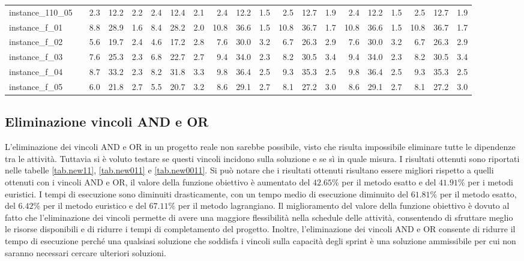 \documentclass[12pt,a4paper,openright,twoside]{book}
\begin{document}
\begin{table}[H]
{\begin{tabular}{|ll|rrrrrr|rrrrrr|rrrrrr|}
 instance\_110\_05            &     &        2.3  &   12.2  &  2.2  &   2.4  &   12.4  &  2.1  &     2.4  &   12.2  &  1.5  &   2.5  &   12.7  &  1.9  &    2.4  &   12.2  &  1.5  &   2.5  &   12.7  &  1.9   \\         
 instance\_f\_01              &     &       8.8  &   28.9  &  1.6  &   8.4  &   28.2  &  2.0  &     10.8  &   36.6  &  1.5  &   10.8  &   36.7  &  1.7  &  10.8  &   36.6  &  1.5  &   10.8  &   36.7  &  1.7  \\       
 instance\_f\_02              &     &        5.6  &   19.7  &  2.4  &   4.6  &   17.2  &  2.8  &     7.6  &   30.0  &  3.2  &   6.7  &   26.3  &  2.9  &    7.6  &   30.0  &  3.2  &   6.7  &   26.3  &  2.9  \\        
 instance\_f\_03              &     &       7.6  &   25.3  &  2.3  &   6.8  &   22.7  &  2.7  &     9.4  &   34.0  &  2.3  &   8.2  &   30.5  &  3.4  &    9.4  &   34.0  &  2.3  &   8.2  &   30.5  &  3.4  \\    
 instance\_f\_04              &     &        8.7  &   33.2  &  2.3  &   8.2  &   31.8  &  3.3  &     9.8  &   36.4  &  2.5  &   9.3  &   35.3  &  2.5  &    9.8  &   36.4  &  2.5  &   9.3  &   35.3  &  2.5  \\        
 instance\_f\_05              &     &       6.0  &   21.8  &  2.7  &   5.5  &   20.7  &  3.2  &     8.6  &   29.1  &  2.7  &   8.1  &   27.2  &  3.0  &    8.6  &   29.1  &  2.7  &   8.1  &   27.2  &  3.0  \\    
  \hline
\end{tabular}
}
\end{table}

\subsection{Eliminazione vincoli AND e OR}

L'eliminazione dei vincoli AND e OR in un progetto reale non sarebbe possibile, visto che  risulta impossibile eliminare tutte le dipendenze tra le attività. Tuttavia si \`e voluto testare se questi vincoli incidono sulla soluzione e se sì in quale misura. I risultati ottenuti sono riportati nelle tabelle \ref{tab.new11}, \ref{tab.new011} e \ref{tab.new0011}. 
Si può notare che i risultati ottenuti risultano essere migliori rispetto a quelli ottenuti con i vincoli AND e OR, il valore della funzione obiettivo \`e aumentato del $42.65\%$ per il metodo esatto e del $41.91\%$ per i metodi euristici. I tempi di esecuzione sono
diminuiti drasticamente, con un tempo medio di esecuzione diminuito del $61.81\%$ per il metodo esatto, del $6.42\%$ per il metodo euristico e del $67.11\%$ per il metodo lagrangiano.
Il miglioramento del valore della funzione obiettivo \`e dovuto al fatto che l'eliminazione dei vincoli permette di avere una maggiore flessibilità nella schedule delle attività, consentendo di sfruttare meglio le risorse disponibili e di ridurre i tempi di completamento del progetto. Inoltre, l'eliminazione dei vincoli AND e OR consente di ridurre 
il tempo di esecuzione perché una qualsiasi soluzione che soddisfa i vincoli sulla capacità degli sprint \`e una soluzione ammissibile per cui non saranno necessari cercare ulteriori soluzioni.
\end{document}
